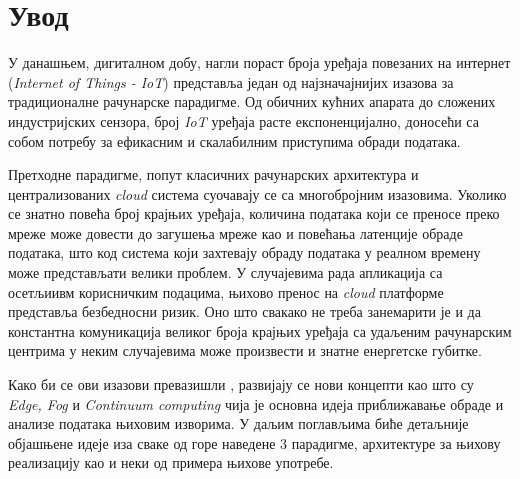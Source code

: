 \section{Увод}
У данашњем, дигиталном добу, нагли пораст броја уређаја повезаних на интернет (\textit{Internet of Things - IoT}) представља један од најзначајнијих изазова за традиционалне рачунарске парадигме. Од обичних кућних апарата до сложених индустријских сензора, број \textit{IoT} уређаја расте експоненцијално, доносећи са собом потребу за ефикасним и скалабилним приступима обради података.

Претходне парадигме, попут класичних рачунарских архитектура и централизованих \textit{cloud} система суочавају се са многобројним изазовима. Уколико се знатно повећа број крајњих уређаја, количина података који се преносе преко мреже може довести до загушења мреже као и повећања латенције обраде података, што код система који захтевају обраду података у реалном времену може представљати велики проблем. У случајевима рада апликација са осетљиивм корисничким подацима, њихово пренос на \textit{cloud} платформе представља безбедносни ризик. Оно што свакако не треба занемарити је и да константна комуникација великог броја крајњих уређаја са удаљеним рачунарским центрима у неким случајевима може произвести и знатне енергетске губитке.

Како би се ови изазови превазишли , развијају се нови концепти као што су \textit{Edge, Fog} и \textit{Continuum computing} чија је основна идеја приближавање обраде и анализе података њиховим изворима. У даљим поглављима биће детаљније објашњене идеје иза сваке од горе наведене 3 парадигме, архитектуре за њихову реализацију као и неки од примера њихове употребе.